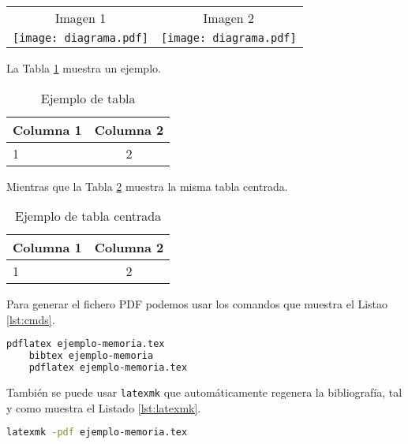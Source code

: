   \begin{tabular}{cc}
    Imagen 1 & Imagen 2 \\[2mm]
    \texttt{[image: diagrama.pdf]} &  \texttt{[image: diagrama.pdf]}
  \end{tabular}

  La Tabla \ref{tbl:ejemplo} muestra un ejemplo.

\begin{table}[h!tb]
  \caption{Ejemplo de tabla \label{tbl:ejemplo}}
  \begin{tabular}{|l|c|}
    \hline
    Columna 1 & Columna 2 \\ \hline
    1 & 2 \\ \hline
  \end{tabular}
\end{table}


  \vspace*{1cm}
  Mientras que la Tabla \ref{tbl:centrada} muestra la misma tabla centrada. 

  \begin{table}[h!tb]
  \caption{Ejemplo de tabla centrada \label{tbl:centrada}}
  \begin{center}
    \begin{tabular}{|l|c|}
      \hline
      Columna 1 & Columna 2 \\ \hline
      1 & 2 \\ \hline
    \end{tabular}
  \end{center}
  
\end{table}

  Para generar el fichero PDF podemos usar los comandos que muestra el Listao \ref{lst:cmds}.

  \begin{lstlisting}[language=bash,caption={Comandos para generar PDF con pdflatex},label={lst:cmds}]
    pdflatex ejemplo-memoria.tex
    bibtex ejemplo-memoria
    pdflatex ejemplo-memoria.tex
\end{lstlisting}

  También se puede usar \texttt{latexmk} que automáticamente regenera la bibliografía, tal y como muestra el Listado \ref{lst:latexmk}.

  \begin{lstlisting}[language=bash,caption={Comandos para generar PDF con latexmk},label={lst:latexmk}]
    latexmk -pdf ejemplo-memoria.tex
\end{lstlisting}
